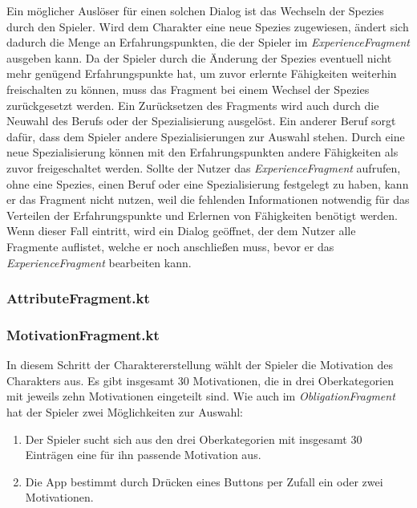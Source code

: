 Ein möglicher Auslöser für einen solchen Dialog ist das Wechseln der Spezies durch den Spieler. Wird dem Charakter eine neue Spezies zugewiesen, ändert sich dadurch die Menge an Erfahrungspunkten, die der Spieler im \textit{ExperienceFragment} ausgeben kann. Da der Spieler durch die Änderung der Spezies eventuell nicht mehr genügend Erfahrungspunkte hat, um zuvor erlernte Fähigkeiten weiterhin freischalten zu können, muss das Fragment bei einem Wechsel der Spezies zurückgesetzt werden. Ein Zurücksetzen des Fragments wird auch durch die Neuwahl des Berufs oder der Spezialisierung ausgelöst. Ein anderer Beruf sorgt dafür, dass dem Spieler andere Spezialisierungen zur Auswahl stehen. Durch eine neue Spezialisierung können mit den Erfahrungspunkten andere Fähigkeiten als zuvor freigeschaltet werden. Sollte der Nutzer das \textit{ExperienceFragment} aufrufen, ohne eine Spezies, einen Beruf oder eine Spezialisierung festgelegt zu haben, kann er das Fragment nicht nutzen, weil die fehlenden Informationen notwendig für das Verteilen der Erfahrungspunkte und Erlernen von Fähigkeiten benötigt werden. Wenn dieser Fall eintritt, wird ein Dialog geöffnet, der dem Nutzer alle Fragmente auflistet, welche er noch anschließen muss, bevor er das \textit{ExperienceFragment} bearbeiten kann.

\subsubsection{AttributeFragment.kt}

\subsubsection{MotivationFragment.kt}
In diesem Schritt der Charaktererstellung wählt der Spieler die Motivation des Charakters aus. Es gibt insgesamt 30 Motivationen, die in drei Oberkategorien mit jeweils zehn Motivationen eingeteilt sind. Wie auch im \textit{ObligationFragment} hat der Spieler zwei Möglichkeiten zur Auswahl:
\begin{enumerate}
\item Der Spieler sucht sich aus den drei Oberkategorien mit insgesamt 30 Einträgen eine für ihn passende Motivation aus.
\item Die App bestimmt durch Drücken eines Buttons per Zufall ein oder zwei Motivationen.
\end{enumerate}

